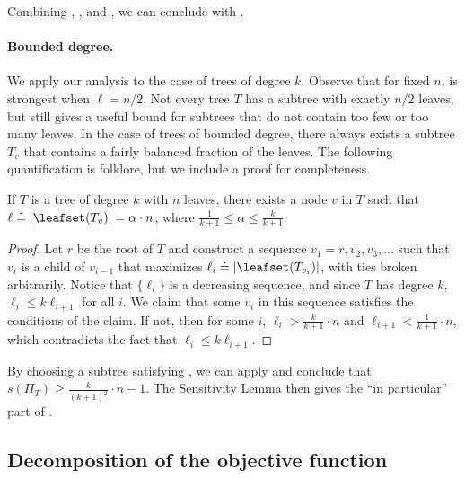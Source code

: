 Combining , , and , we can conclude with .

\paragraph{Bounded degree.}
We apply our analysis to the case of trees of degree $k$. Observe that for fixed $n$,  is strongest when $\ell=n/2$. Not every tree $T$ has a subtree with exactly $n/2$ leaves, but  still gives a useful bound for subtrees that do not contain too few or too many leaves. In the case of trees of bounded degree, there always exists a subtree $T_v$ that contains a fairly balanced fraction of the leaves. The following quantification is folklore, but we include a proof for completeness.
 
\begin{fact}
    \label{fact:k-ary:balance}
    If $T$ is a tree of degree $k$ with $n$ leaves, there exists a node $v$ in $T$ such that $\ell \doteq \lvert\leafset(T_v)\rvert = \alpha 
    \cdot n$, where $\frac{1}{k+1} \le \alpha \le \frac{k}{k+1}$.
\end{fact}

\begin{proof}
    Let $r$ be the root of $T$ and construct a sequence $v_1=r,v_2,v_3,\dots$ such that $v_{i}$ is a child of $v_{i-1}$ that maximizes $\ell_{i} \doteq \lvert\leafset(T_{v_{i}})\rvert$, with ties broken arbitrarily. Notice that $\{\ell_i\}$ is a decreasing sequence, and since $T$ has degree $k$, $\ell_{i} \le k\ell_{i+1}$ for all $i$. We claim that some $v_i$ in this sequence satisfies the conditions of the claim. If not, then for some $i$, $\ell_i> \frac{k}{k+1}\cdot n$ and $\ell_{i+1}< \frac{1}{k+1}\cdot n$, which contradicts the fact that $\ell_i\le k\ell_{i+1}$.
\end{proof}

By choosing a subtree satisfying , we can apply  and conclude that $s(\Pi_T)\ge \frac{k}{(k+1)^2} \cdot n -1$. The Sensitivity Lemma then gives the ``in particular'' part of .

\subsection{Decomposition of the objective function}
\label{sec:decomposition}

